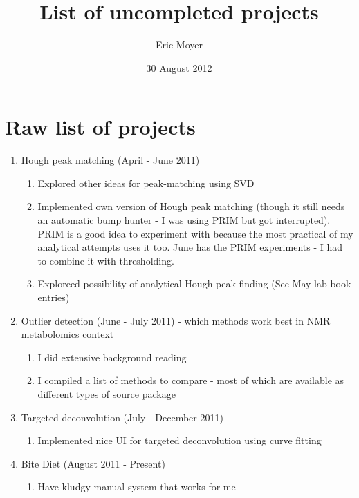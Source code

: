 \documentclass[english]{article}
\begin{document}
\title{List of uncompleted projects}


\author{Eric Moyer}


\date{30 August 2012}

\maketitle

\section{Raw list of projects}

\begin{enumerate}
\item Hough peak matching (April - June 2011)
      \begin{enumerate}
      \item Explored other ideas for peak-matching using SVD
      \item Implemented own version of Hough peak matching (though it still needs 
            an automatic bump hunter - I was using PRIM but got interrupted). 
            PRIM is a good idea to experiment with because the most practical of
            my analytical attempts uses it too. June has the PRIM experiments - 
            I had to combine it with thresholding.
      \item Exploreed possibility of analytical Hough peak finding 
            (See May lab book entries)
      \end{enumerate}
\item Outlier detection (June - July 2011) - which methods work best in NMR
      metabolomics context
      \begin{enumerate}
      \item I did extensive background reading
      \item I compiled a list of methods to compare - most of which are available
            as different types of source package
      \end{enumerate}
\item Targeted deconvolution (July - December 2011)
      \begin{enumerate}
      \item Implemented nice UI for targeted deconvolution using curve fitting
      \end{enumerate}
\item Bite Diet (August 2011 - Present)
      \begin{enumerate}
      \item Have kludgy manual system that works for me

\end{enumerate}
\end{enumerate}
\end{document}
